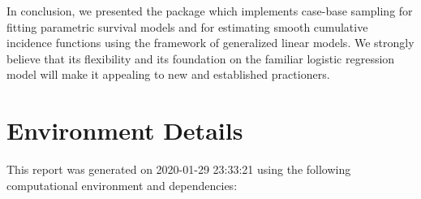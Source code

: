 \documentclass[
]{jss}
\begin{document}
In conclusion, we presented the  package 
which implements case-base sampling for fitting parametric survival
models and for estimating smooth cumulative incidence functions using
the framework of generalized linear models. We strongly believe that its
flexibility and its foundation on the familiar logistic regression model
will make it appealing to new and established practioners.

\hypertarget{environment-details}{%
\section{Environment Details}\label{environment-details}}

This report was generated on 2020-01-29 23:33:21 using the following
computational environment and dependencies:
\end{document}
